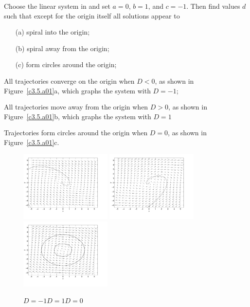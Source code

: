 \documentclass{ximera}
\begin{document}
\begin{computerExercise} \label{c3.5.a01}
Choose the {\sf linear system} in {\pplane} and set $a=0$, $b=1$, and 
$c=-1$.  Then find values $d$ such that except for the origin itself all 
solutions appear to
\begin{itemize}
\item[(a)] spiral into the origin;
\item[(b)] spiral away from the origin;
\item[(c)] form circles around the origin;
\end{itemize}

\begin{solution}

\soln
\begin{enumeratea}
\item All trajectories converge on the origin when $D < 0$, as shown in
Figure~\ref{c3.5.a01}a, which graphs the system with $D =- 1$;

\item All trajectories move away from the origin when $D > 0$, as shown in
Figure~\ref{c3.5.a01}b, which graphs the system with $D = 1$

\item Trajectories form circles around the origin when $D = 0$, as shown in
Figure~\ref{c3.5.a01}c.
\begin{figure}[htb]
                       \centerline{%
                       \includegraphics[width=1.8in]{exfigure/3-5-a01a.pdf}
                       \includegraphics[width=1.8in]{exfigure/3-5-a01b.pdf}
                       \includegraphics[width=1.8in]{exfigure/3-5-a01c.pdf}}
	\centerline{$D = -1$\hspace{1.4in}$D = 1$\hspace{1.4in}$D = 0$}
\end{figure}
\end{enumeratea}
\end{solution}
\end{computerExercise}
\end{document}
